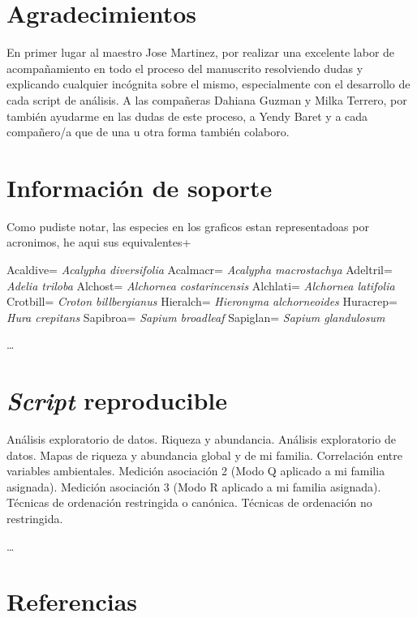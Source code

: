 \documentclass[11pt,]{article}
\begin{document}
\section{Agradecimientos}\label{agradecimientos}

En primer lugar al maestro Jose Martinez, por realizar una excelente
labor de acompañamiento en todo el proceso del manuscrito resolviendo
dudas y explicando cualquier incógnita sobre el mismo, especialmente con
el desarrollo de cada script de análisis. A las compañeras Dahiana
Guzman y Milka Terrero, por también ayudarme en las dudas de este
proceso, a Yendy Baret y a cada compañero/a que de una u otra forma
también colaboro.

\section{Información de soporte}\label{informaciuxf3n-de-soporte}

Como pudiste notar, las especies en los graficos estan representadoas
por acronimos, he aqui sus equivalentes+

Acaldive= \emph{Acalypha diversifolia} Acalmacr= \emph{Acalypha
macrostachya} Adeltril= \emph{Adelia triloba} Alchost= \emph{Alchornea
costarincensis} Alchlati= \emph{Alchornea latifolia} Crotbill=
\emph{Croton billbergianus} Hieralch= \emph{Hieronyma alchorneoides}
Huracrep= \emph{Hura crepitans} Sapibroa= \emph{Sapium broadleaf}
Sapiglan= \emph{Sapium glandulosum}

\ldots

\section{\texorpdfstring{\emph{Script}
reproducible}{Script reproducible}}\label{script-reproducible}

Análisis exploratorio de datos. Riqueza y abundancia. Análisis
exploratorio de datos. Mapas de riqueza y abundancia global y de mi
familia. Correlación entre variables ambientales. Medición asociación 2
(Modo Q aplicado a mi familia asignada). Medición asociación 3 (Modo R
aplicado a mi familia asignada). Técnicas de ordenación restringida o
canónica. Técnicas de ordenación no restringida.

\ldots

\section{Referencias}\label{referencias}
\end{document}
